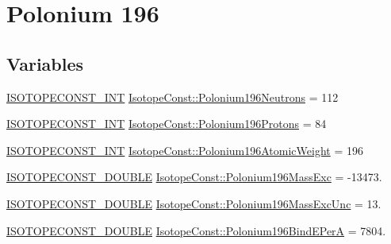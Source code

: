 \hypertarget{group___isotope_const-_polonium-_po196}{}\section{Polonium 196}
\label{group___isotope_const-_polonium-_po196}
\subsection*{Variables}
\begin{DoxyCompactItemize}
\item 
\mbox{\hyperlink{group___isotope_const-_macros_ga5f18360b3e99483a35c32d789e62621c}{I\+S\+O\+T\+O\+P\+E\+C\+O\+N\+S\+T\+\_\+\+I\+NT}} \mbox{\hyperlink{group___isotope_const-_polonium-_po196_ga0f593d8796e5fdf88e9346b19c17b026}{Isotope\+Const\+::\+Polonium196\+Neutrons}} = 112
\item 
\mbox{\hyperlink{group___isotope_const-_macros_ga5f18360b3e99483a35c32d789e62621c}{I\+S\+O\+T\+O\+P\+E\+C\+O\+N\+S\+T\+\_\+\+I\+NT}} \mbox{\hyperlink{group___isotope_const-_polonium-_po196_gab8ded7c950ed659ab1724a0bc9c1484e}{Isotope\+Const\+::\+Polonium196\+Protons}} = 84
\item 
\mbox{\hyperlink{group___isotope_const-_macros_ga5f18360b3e99483a35c32d789e62621c}{I\+S\+O\+T\+O\+P\+E\+C\+O\+N\+S\+T\+\_\+\+I\+NT}} \mbox{\hyperlink{group___isotope_const-_polonium-_po196_gafa6f4b0a600e8eefd743fb07d5097986}{Isotope\+Const\+::\+Polonium196\+Atomic\+Weight}} = 196
\item 
\mbox{\hyperlink{group___isotope_const-_macros_ga8f45a7272ce02c0b4c65c44636ed719a}{I\+S\+O\+T\+O\+P\+E\+C\+O\+N\+S\+T\+\_\+\+D\+O\+U\+B\+LE}} \mbox{\hyperlink{group___isotope_const-_polonium-_po196_gacfd686471a7ea40f5b113e558ce078fb}{Isotope\+Const\+::\+Polonium196\+Mass\+Exc}} = -\/13473.
\item 
\mbox{\hyperlink{group___isotope_const-_macros_ga8f45a7272ce02c0b4c65c44636ed719a}{I\+S\+O\+T\+O\+P\+E\+C\+O\+N\+S\+T\+\_\+\+D\+O\+U\+B\+LE}} \mbox{\hyperlink{group___isotope_const-_polonium-_po196_ga78fa80368192a75d993e45497dc09d8a}{Isotope\+Const\+::\+Polonium196\+Mass\+Exc\+Unc}} = 13.
\item 
\mbox{\hyperlink{group___isotope_const-_macros_ga8f45a7272ce02c0b4c65c44636ed719a}{I\+S\+O\+T\+O\+P\+E\+C\+O\+N\+S\+T\+\_\+\+D\+O\+U\+B\+LE}} \mbox{\hyperlink{group___isotope_const-_polonium-_po196_gafe90e0cf0a13f5769c172b4726cb1169}{Isotope\+Const\+::\+Polonium196\+Bind\+E\+PerA}} = 7804.
\item 

\end{DoxyCompactItemize}
